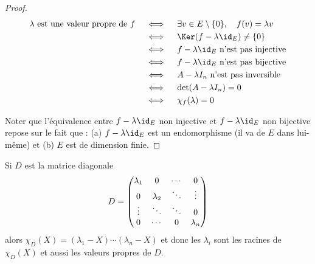 \documentclass[12pt, class=report,crop=false]{standalone}
\begin{document}
\begin{proof}


\begin{align*}
\lambda \text{ est une valeur propre de } f
&\quad\iff\quad \exists v \in E\setminus\{0\}, \quad  f(v) = \lambda v \\
&\quad\iff\quad \Ker(f-\lambda \id_E) \neq \{0\} \\
&\quad\iff\quad f-\lambda\id_E \text{ n'est pas injective} \\
&\quad\iff\quad f-\lambda\id_E \text{ n'est pas bijective} \\
&\quad\iff\quad A-\lambda I_n \text{ n'est pas inversible} \\
&\quad\iff\quad \det (A-\lambda I_n) = 0 \\
&\quad\iff\quad \chi_f(\lambda) = 0
\end{align*}

Noter que l'équivalence entre \og{}$f-\lambda\id_E$ non injective\fg{}
et \og{}$f-\lambda\id_E$ non bijective\fg{} repose sur le fait que :
(a) $f-\lambda\id_E$ est un endomorphisme (il va de $E$ dans lui-même)
et (b) $E$ est de dimension finie.
\end{proof}



\begin{exemple}
Si $D$ est la matrice diagonale
$$D = \begin{pmatrix}
\lambda_{1}&0&\cdots&0 \cr
0&\lambda_{2}&\ddots&\vdots\cr
\vdots&\ddots& \ddots &0\cr
0&\cdots&0& \lambda_{n} \cr
\end{pmatrix}$$ 
alors $\chi_D(X) = (\lambda_1-X)\cdots(\lambda_n-X)$ et donc les $\lambda_i$ sont les racines de $\chi_D(X)$ et aussi
les valeurs propres de $D$.
\end{exemple}
\end{document}
